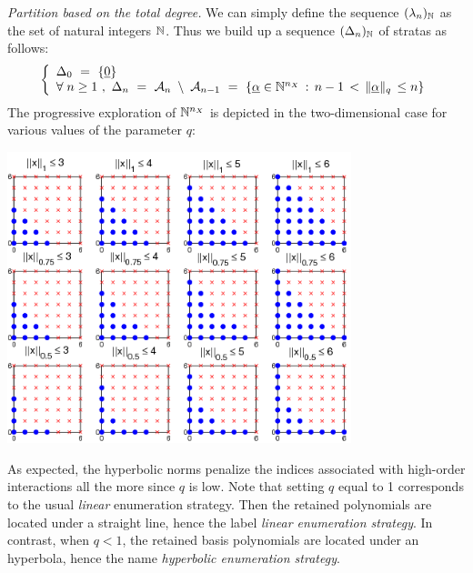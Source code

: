 {\textit{Partition based on the total degree. }  We can simply define the sequence $(\lambda_n)_{{\mathbb N}}$ as the set of natural integers ${\mathbb N}$. Thus we build up a sequence $(\Delta_n)_{{\mathbb N}}$ of stratas as follows:
\begin{equation}
  \left\{
  \begin{array}{l}
    \Delta_0 \, \, = \, \, \{{\underline{0}}\} \\
    \forall \; n  \geq  1 \, \, , \, \, \Delta_n \, \, = \, \, {\mathcal A}_{n} \; \setminus \; {\mathcal A}_{n-1}  \, \, = \, \,
    \{\underline{\alpha} \in {\mathbb N}^{n_X} \, : \, n - 1 \, < \, \|\underline{\alpha}\|_q \, \leq n \}      \\
  \end{array}
  \right.
\end{equation}
The progressive exploration of ${\mathbb N}^{n_X}$ is depicted in the two-dimensional case for various values of the parameter $q$:
\begin{center}   \includegraphics[width = 10cm]{Figures/qnorms_2D.png} \end{center}

As expected, the hyperbolic norms penalize the indices associated with high-order interactions all the more since $q$ is low. Note that setting $q$ equal to 1 corresponds to the usual \emph{linear} enumeration strategy. Then the retained polynomials are located under a straight line, hence the label \emph{linear enumeration strategy}. In contrast, when $q < 1$, the retained basis polynomials are located under an hyperbola, hence the name \emph{hyperbolic enumeration strategy}. \\

}
